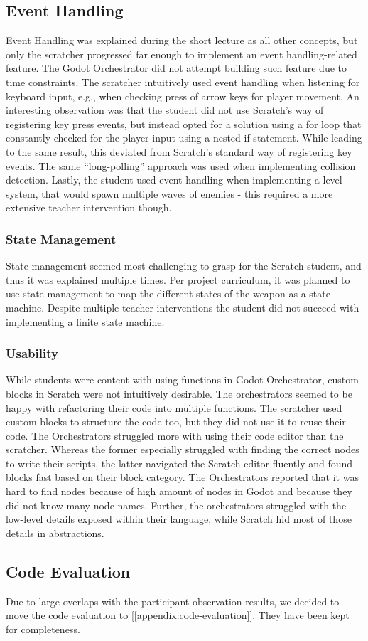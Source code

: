 \subsection{Event Handling}
Event Handling was explained during the short lecture as all other concepts, but only the scratcher progressed far enough to implement an event handling-related feature.
The Godot Orchestrator did not attempt building such feature due to time constraints.
The scratcher intuitively used event handling when listening for keyboard input, e.g., when checking press of arrow keys for player movement.
An interesting observation was that the student did not use Scratch's way of registering key press events, but instead opted for a solution using a for loop that constantly checked for the player input using a nested if statement.
While leading to the same result, this deviated from Scratch's standard way of registering key events.
The same “long-polling” approach was used when implementing collision detection.
Lastly, the student used event handling when implementing a level system, that would spawn multiple waves of enemies - this required a more extensive teacher intervention though.

\subsubsection{State Management}
State management seemed most challenging to grasp for the Scratch student, and thus it was explained multiple times.
Per project curriculum, it was planned to use state management to map the different states of the weapon as a state machine.
Despite multiple teacher interventions the student did not succeed with implementing a finite state machine.

\subsubsection{Usability}
While students were content with using functions in Godot Orchestrator, custom blocks in Scratch were not intuitively desirable.
The orchestrators seemed to be happy with refactoring their code into multiple functions.
The scratcher used custom blocks to structure the code too, but they did not use it to reuse their code.
The Orchestrators struggled more with using their code editor than the scratcher.
Whereas the former especially struggled with finding the correct nodes to write their scripts, the latter navigated the Scratch editor fluently and found blocks fast based on their block category.
The Orchestrators reported that it was hard to find nodes because of high amount of nodes in Godot and because they did not know many node names.
Further, the orchestrators struggled with the low-level details exposed within their language, while Scratch hid most of those details in abstractions.

\subsection{Code Evaluation}
Due to large overlaps with the participant observation results, we decided to move the code evaluation to [\ref{appendix:code-evaluation}]. They have been kept for completeness.